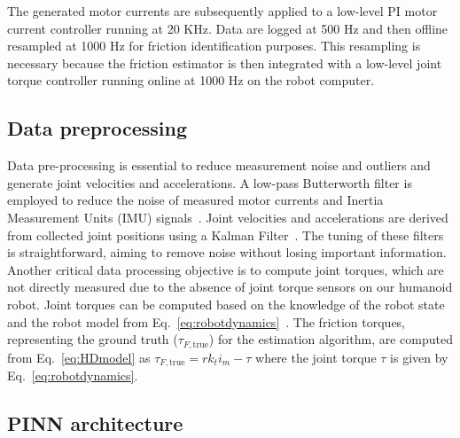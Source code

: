 The generated motor currents are subsequently applied to a low-level PI motor current controller running at 20 KHz.
Data are logged at 500 Hz and then offline resampled at 1000 Hz for friction identification purposes. This resampling is necessary because the friction estimator is then integrated with a low-level joint torque controller running online at 1000 Hz on the robot computer.

\subsection{Data preprocessing}
Data pre-processing is essential to reduce measurement noise and outliers and generate joint velocities and accelerations. A low-pass Butterworth filter is employed to reduce the noise of measured motor currents and Inertia Measurement Units (IMU) signals~\cite{mahata2018optimal}. Joint velocities and accelerations are derived from collected joint positions using a Kalman Filter~\cite{welch1995introduction}. The tuning of these filters is straightforward, aiming to remove noise without losing important information.
Another critical data processing objective is to compute joint torques, which are not directly measured due to the absence of joint torque sensors on our humanoid robot. Joint torques can be computed based on the knowledge of the robot state and the robot model from Eq.~\ref{eq:robotdynamics}~\cite{traversaro2017thesis}. The friction torques, representing the ground truth ($\tau_{F, \text{true}}$) for the estimation algorithm, are computed from Eq.~\eqref{eq:HDmodel} as $\tau_{F, \text{true}} = r k_t i_m - \tau $ where the joint torque $ \tau $ is given by Eq.~\eqref{eq:robotdynamics}.


\subsection{PINN architecture}

